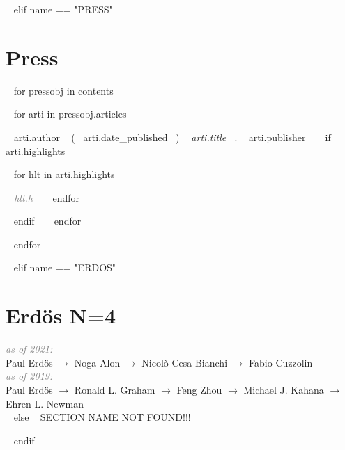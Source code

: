 ~{ elif name == "PRESS" }~

\section{Press}

~{ for pressobj in contents }~ 
\begin{etaremune}[itemindent=-\bibhang, topsep=0pt,
				   itemsep=\bibsep,partopsep=0pt,parsep=0pt,leftmargin={\bibhang+\widthof{[999]}}] 
    
    ~{ for arti in pressobj.articles }~
    \item ~{{ arti.author }}~ (~{{ arti.date_published }}~) \textit{~{{ arti.title }}~}. ~{{ arti.publisher }}~
     ~{ if arti.highlights }~
     	\begin{innerlist}
     	~{ for hlt in arti.highlights }~
	     \item  \textcolor{grey}{\textit{~{{ hlt.h }}~} }
     	~{ endfor }~
     	\end{innerlist}
     ~{ endif }~
	~{ endfor }~


\end{etaremune}
~{ endfor }~













~{ elif name == "ERDOS" }~

\section{Erdös N=4}

\textit{\textcolor{grey}{as of 2021:}}\\
Paul Erdös $\rightarrow$ Noga Alon $\rightarrow$ Nicolò Cesa-Bianchi $\rightarrow$ Fabio Cuzzolin\\

\textit{\textcolor{grey}{as of 2019:}}\\
Paul Erdös $\rightarrow$ Ronald L. Graham $\rightarrow$ Feng Zhou $\rightarrow$ Michael J. Kahana $\rightarrow$ Ehren L. Newman\\





~{ else }~
SECTION NAME NOT FOUND!!!


~{ endif }~











